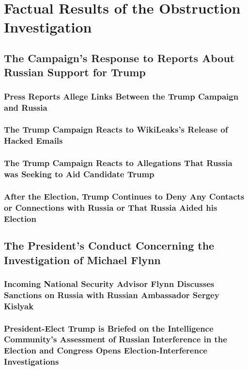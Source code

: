 \section{Factual Results of the Obstruction Investigation}

\subsection{The Campaign’s Response to Reports About Russian Support for Trump}

\subsubsection{Press Reports Allege Links Between the Trump Campaign and Russia}

\subsubsection{The Trump Campaign Reacts to WikiLeaks’s Release of Hacked Emails}

\subsubsection{The Trump Campaign Reacts to Allegations That Russia was Seeking to Aid Candidate Trump}

\subsubsection{After the Election, Trump Continues to Deny Any Contacts or Connections with Russia or That Russia Aided his Election}

\subsection{The President’s Conduct Concerning the Investigation of Michael Flynn}

\subsubsection{Incoming National Security Advisor Flynn Discusses Sanctions on Russia with Russian Ambassador Sergey Kislyak}

\subsubsection{President-Elect Trump is Briefed on the Intelligence Community’s Assessment of Russian Interference in the Election and Congress Opens Election-Interference Investigations}

